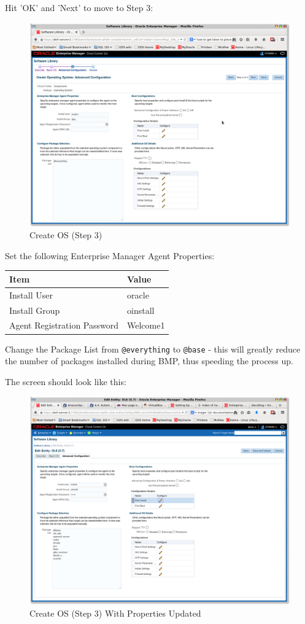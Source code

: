 \documentclass[11pt]{article}
\begin{document}
Hit 'OK' and 'Next' to move to Step 3:

\begin{figure}[htb]
\centering
\includegraphics[width=.9\linewidth]{./images/Create_OS_3.png}
\caption{Create OS (Step 3)}
\end{figure}
\clearpage

Set the following Enterprise Manager Agent Properties:
\begin{center}
\begin{tabular}{ll}
Item & Value\\
\hline
Install User & oracle\\
Install Group & oinstall\\
Agent Registration Password & Welcome1\\
\end{tabular}
\end{center}

Change the Package List from \texttt{@everything} to \texttt{@base} - this will greatly reduce the number of packages installed during BMP, thus speeding the process up.

The screen should look like this:
\begin{figure}[htb]
\centering
\includegraphics[width=.9\linewidth]{./images/Create_OS_3_Updated.png}
\caption{Create OS (Step 3) With Properties Updated}
\end{figure}
\clearpage
\end{document}

